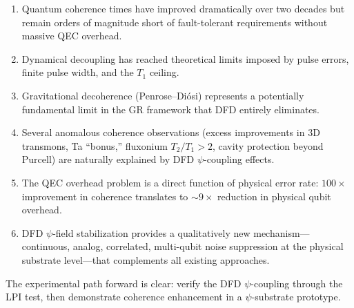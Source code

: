 \documentclass[11pt,letterpaper]{article}
\begin{document}
\begin{enumerate}
\item Quantum coherence times have improved dramatically over two decades
but remain orders of magnitude short of fault-tolerant requirements
without massive QEC overhead.

\item Dynamical decoupling has reached theoretical limits imposed by
pulse errors, finite pulse width, and the $T_1$ ceiling.

\item Gravitational decoherence (Penrose--Di\'osi) represents a
potentially fundamental limit in the GR framework that DFD entirely
eliminates.

\item Several anomalous coherence observations (excess improvements in
3D transmons, Ta ``bonus,'' fluxonium $T_2/T_1 > 2$, cavity protection
beyond Purcell) are naturally explained by DFD $\psi$-coupling effects.

\item The QEC overhead problem is a direct function of physical error
rate: $100\times$ improvement in coherence translates to $\sim 9\times$
reduction in physical qubit overhead.

\item DFD $\psi$-field stabilization provides a qualitatively new
mechanism---continuous, analog, correlated, multi-qubit noise suppression
at the physical substrate level---that complements all existing approaches.
\end{enumerate}

The experimental path forward is clear: verify the DFD $\psi$-coupling
through the LPI test, then demonstrate coherence enhancement in a
$\psi$-substrate prototype.
\end{document}
